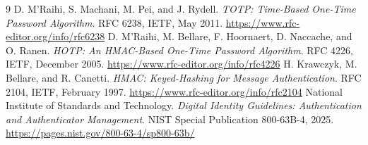 \documentclass[11pt]{article}
\begin{document}
\begin{thebibliography}{9}
 D. M'Raihi, S. Machani, M. Pei, and J. Rydell.
  \textit{TOTP: Time-Based One-Time Password Algorithm}. RFC 6238, IETF, May
  2011. \url{https://www.rfc-editor.org/info/rfc6238}
 D. M'Raihi, M. Bellare, F. Hoornaert, D. Naccache, and
  O. Ranen. \textit{HOTP: An HMAC-Based One-Time Password Algorithm}. RFC 4226,
  IETF, December 2005. \url{https://www.rfc-editor.org/info/rfc4226}
 H. Krawczyk, M. Bellare, and R. Canetti. \textit{HMAC:
  Keyed-Hashing for Message Authentication}. RFC 2104, IETF, February 1997.
  \url{https://www.rfc-editor.org/info/rfc2104}
 National Institute of Standards and Technology. \textit{Digital
  Identity Guidelines: Authentication and Authenticator Management}. NIST
  Special Publication 800-63B-4, 2025. \url{https://pages.nist.gov/800-63-4/sp800-63b/}
\end{thebibliography}
\end{document}
